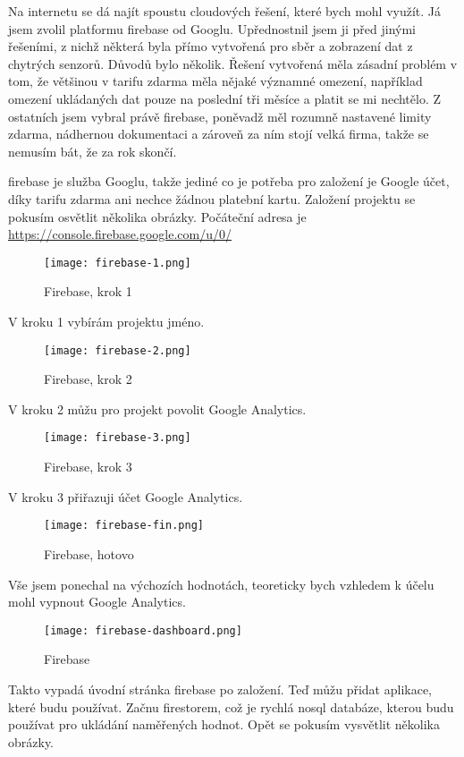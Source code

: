 Na internetu se dá najít spoustu cloudových řešení, které bych mohl využít. Já jsem zvolil platformu \gls{firebase} od 
Googlu. Upřednostnil jsem ji před jinými řešeními, z nichž některá byla přímo vytvořená pro sběr a zobrazení dat 
z chytrých senzorů. Důvodů bylo několik. Řešení vytvořená  měla zásadní problém v tom, že většinou v tarifu 
zdarma měla nějaké významné omezení, například omezení ukládaných dat pouze na poslední tři měsíce a platit se mi 
nechtělo. Z ostatních jsem vybral právě \gls{firebase}, poněvadž měl rozumně nastavené limity zdarma, nádhernou 
dokumentaci a zároveň za ním stojí velká firma, takže se nemusím bát, že za rok skončí.

\gls{firebase} je služba Googlu, takže jediné co je potřeba pro založení je Google účet, díky tarifu zdarma ani nechce 
žádnou platební kartu. Založení projektu se pokusím osvětlit několika obrázky. Počáteční adresa je 
\url{https://console.firebase.google.com/u/0/}

\begin{figure}[H]
    \centering
    \texttt{[image: firebase-1.png]}
    \caption{Firebase, krok 1}
\end{figure}
V kroku 1 vybírám projektu jméno.
\begin{figure}[H]
    \centering
    \texttt{[image: firebase-2.png]}
    \caption{Firebase, krok 2}
\end{figure}
V kroku 2 můžu pro projekt povolit Google Analytics.
\begin{figure}[H]
    \centering
    \texttt{[image: firebase-3.png]}
    \caption{Firebase, krok 3}
\end{figure}
V kroku 3 přiřazuji účet Google Analytics.%
\begin{figure}[H]
    \centering
    \texttt{[image: firebase-fin.png]}
    \caption{Firebase, hotovo}
\end{figure}
Vše jsem ponechal na výchozích hodnotách, teoreticky bych vzhledem k účelu mohl vypnout Google Analytics.
\begin{figure}[H]
    \centering
    \texttt{[image: firebase-dashboard.png]}
    \caption{Firebase}
\end{figure}
Takto vypadá úvodní stránka \gls{firebase} po založení. Teď můžu přidat aplikace, které budu používat. Začnu firestorem, 
což je rychlá \gls{nosql} databáze, kterou budu používat pro ukládání naměřených hodnot. Opět se pokusím vysvětlit 
několika obrázky.


